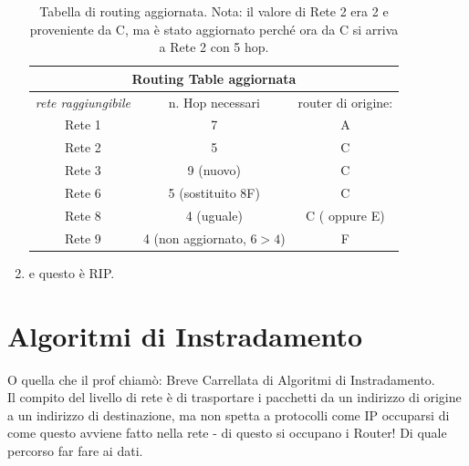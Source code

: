 \begin{enumerate}
\begin{table}[ht]
\centering
\begin{tabular}{ccc}
\multicolumn{3}{c}{Routing Table aggiornata}                                                                                        \\ \hline
\multicolumn{1}{|c|}{\textit{rete raggiungibile}} & \multicolumn{1}{c|}{n. Hop necessari} & \multicolumn{1}{c|}{router di origine:} \\ \hline
\multicolumn{1}{|c|}{Rete 1}                      & \multicolumn{1}{c|}{7}                & \multicolumn{1}{c|}{A}                  \\ \hline
\multicolumn{1}{|c|}{Rete 2}                      & \multicolumn{1}{c|}{5}                & \multicolumn{1}{c|}{C}                  \\ \hline
\multicolumn{1}{|c|}{Rete 3}                      & \multicolumn{1}{c|}{9 (nuovo)}                & \multicolumn{1}{c|}{C}                  \\ \hline
\multicolumn{1}{|c|}{Rete 6}                      & \multicolumn{1}{c|}{5 (sostituito 8F)}                & \multicolumn{1}{c|}{C}                  \\ \hline
\multicolumn{1}{|c|}{Rete 8}                      & \multicolumn{1}{c|}{4 (uguale)}                & \multicolumn{1}{c|}{C ( oppure E)}                  \\ \hline
\multicolumn{1}{|c|}{Rete 9}                      & \multicolumn{1}{c|}{4 (non aggiornato, $6>4$)}                & \multicolumn{1}{c|}{F}                  \\ \hline
\end{tabular}
\caption{Tabella di routing aggiornata. Nota: il valore di Rete 2 era 2 e proveniente da C, ma è stato aggiornato perché ora da C si arriva a Rete 2 con 5 hop.}
\end{table}
\item e questo è RIP.
\end{enumerate}

\section*{Algoritmi di Instradamento}
\noindent O quella che il prof chiamò: Breve Carrellata di Algoritmi di Instradamento.\\

\noindent Il compito del livello di rete è di trasportare i pacchetti da un indirizzo di origine a un indirizzo di destinazione, ma non spetta a protocolli come IP occuparsi di come questo avviene fatto nella rete - di questo si occupano i Router! Di quale percorso far fare ai dati.\\

